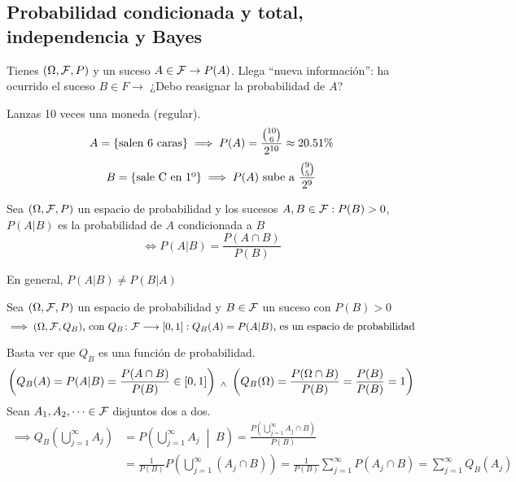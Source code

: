 \subsection{Probabilidad condicionada y total, independencia y Bayes}
Tienes $(\Omega, \mathcal{F}, P)$ y un suceso $A\in \mathcal{F} \rightarrow P(A)$. Llega ``nueva
información'': ha ocurrido el suceso $B\in F \longrightarrow$ ¿Debo reasignar
la probabilidad de $A$?
\begin{ejem}[Dependencia]
	Lanzas 10 veces una moneda (regular).
	\[A=\{\text{salen 6 caras}\} \implies P(A)=\frac{\binom{10}{6}}{2^{10}} \approx 20.51 \%\]
	\[B=\{\text{sale C en 1º}\} \implies P(A)\text{ sube a }\frac{\binom{9}{5}}{2^9}\]
\end{ejem}

\begin{defn}
	Sea $(\Omega, \mathcal{F}, P)$ un espacio de probabilidad y los sucesos $A, B \in \mathcal{F} : P(B)>0$, $P(A|B)$ es la probabilidad de $A$ condicionada a $B$
	\[\iff P(A|B)=\frac{P(A\cap B)}{P(B)}\]
	\begin{obs}
		En general, $P(A|B)\ne P(B|A)$
	\end{obs}
\end{defn}
\begin{prop}
	Sea $(\Omega, \mathcal{F}, P)$ un espacio de probabilidad y $B \in \mathcal{F}$ un suceso con $P(B)>0$
	\[\implies (\Omega, \mathcal{F}, Q_B) \text{, con } Q_B \colon \mathcal{F} \longrightarrow \left[0,1\right]:Q_B(A)=P(A|B) \text{, es un espacio de probabilidad}\]
	\begin{dem}
		Basta ver que $Q_B$ es una función de probabilidad.
		\[\left(Q_B(A)=P(A|B)=\frac{P(A\cap B)}{P(B)} \in \left[0, 1\right]\right) \; _{\wedge} \; \left(Q_B(\Omega)=\frac{P(\Omega\cap B)}{P(B)}=\frac{P(B)}{P(B)}=1\right)\]
		Sean $A_1, A_2, \dots \in \mathcal{F}$ disjuntos dos a dos.
		\begin{equation*}
			\begin{split}
				\implies Q_B\left(\bigcup_{j=1}^\infty A_j\right) & =P\left(\bigcup_{j=1}^\infty A_j\;\middle|\; B\right)=\frac{P\left(\bigcup_{j=1}^\infty A_j \cap B\right)}{P(B)}                         \\
				                                                  & =\frac{1}{P(B)}P\left(\bigcup_{j=1}^\infty (A_j \cap B)\right)=\frac{1}{P(B)}\sum_{j=1}^\infty P(A_j\cap B) = \sum_{j=1}^\infty Q_B(A_j)
			\end{split}
		\end{equation*}
	\end{dem}
\end{prop}

